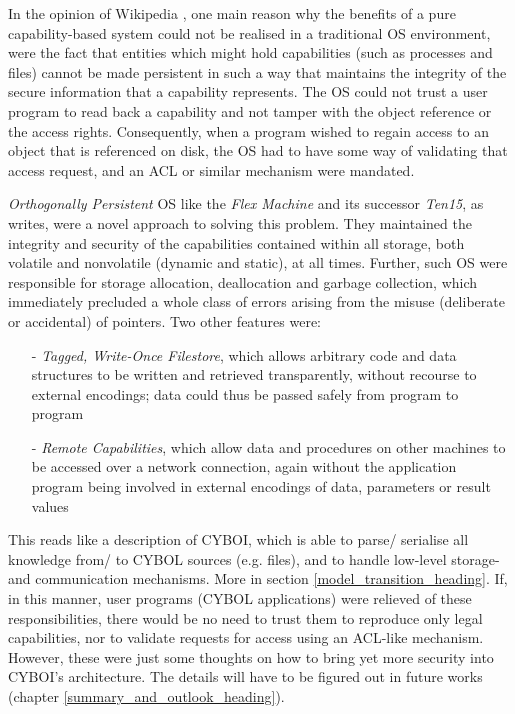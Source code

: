 In the opinion of Wikipedia \cite{wikipedia}, one main reason why the benefits
of a pure capability-based system could not be realised in a traditional OS
environment, were the fact that entities which might hold capabilities (such as
processes and files) cannot be made persistent in such a way that maintains the
integrity of the secure information that a capability represents. The OS could
not trust a user program to read back a capability and not tamper with the
object reference or the access rights. Consequently, when a program wished to
regain access to an object that is referenced on disk, the OS had to have some
way of validating that access request, and an ACL or similar mechanism were
mandated.

\emph{Orthogonally Persistent} OS like the \emph{Flex Machine} and its successor
\emph{Ten15}, as \cite{wikipedia} writes, were a novel approach to solving this
problem. They maintained the integrity and security of the capabilities contained
within all storage, both volatile and nonvolatile (dynamic and static), at all
times. Further, such OS were responsible for storage allocation, deallocation
and garbage collection, which immediately precluded a whole class of errors
arising from the misuse (deliberate or accidental) of pointers. Two other
features were:

\begin{itemize}
    \item[-] \emph{Tagged, Write-Once Filestore}, which allows arbitrary code
        and data structures to be written and retrieved transparently, without
        recourse to external encodings; data could thus be passed safely from
        program to program
    \item[-] \emph{Remote Capabilities}, which allow data and procedures on
        other machines to be accessed over a network connection, again without
        the application program being involved in external encodings of data,
        parameters or result values
\end{itemize}

This reads like a description of CYBOI, which is able to parse/ serialise all
knowledge from/ to CYBOL sources (e.g. files), and to handle low-level storage-
and communication mechanisms. More in section \ref{model_transition_heading}.
If, in this manner, user programs (CYBOL applications) were relieved of these
responsibilities, there would be no need to trust them to reproduce only legal
capabilities, nor to validate requests for access using an ACL-like mechanism.
However, these were just some thoughts on how to bring yet more security into
CYBOI's architecture. The details will have to be figured out in future works
(chapter \ref{summary_and_outlook_heading}).
